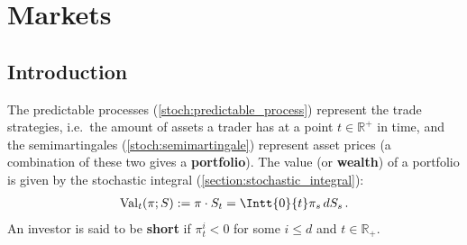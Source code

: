 
\section{Markets}
\subsection{Introduction}

    The predictable processes (\cref{stoch:predictable_process}) represent the trade strategies, i.e.~the amount of assets a trader has at a point $t\in\mathbb{R}^+$ in time, and the semimartingales (\cref{stoch:semimartingale}) represent asset prices (a combination of these two gives a \textbf{portfolio}). The value (or \textbf{wealth}) of a portfolio is given by the stochastic integral (\cref{section:stochastic_integral}):
    \begin{gather}
        \mathrm{Val}_t(\pi;S) := \pi\cdot S_t = \Intt{0}{t}\pi_s\,dS_s\,.
    \end{gather}
    An investor is said to be \textbf{short} if $\pi^i_t<0$ for some $i\leq d$ and $t\in\mathbb{R}_+$.

